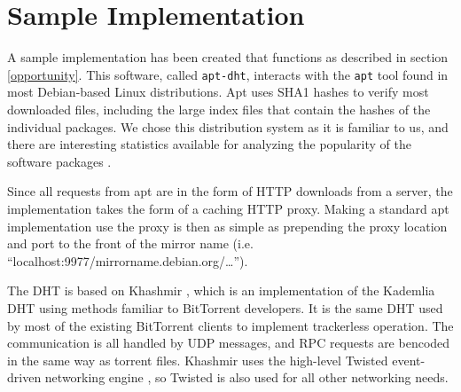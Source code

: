 \documentclass[conference]{IEEEtran}
\begin{document}
% 


\section{Sample Implementation}
\label{implementation}

A sample implementation has been created that functions as described
in section \ref{opportunity}. This software, called
\texttt{apt-dht}, interacts with the \texttt{apt} tool found in most
Debian-based Linux distributions. Apt uses SHA1 hashes to
verify most downloaded files, including the large index files that
contain the hashes of the individual packages. We chose this
distribution system as it is familiar to us, and there are
interesting statistics available for analyzing the popularity of the
software packages \cite{popcon}.

Since all requests from apt are in the form of HTTP downloads from a
server, the implementation takes the form of a caching HTTP proxy.
Making a standard apt implementation use the proxy is then as simple
as prepending the proxy location and port to the front of the mirror
name (i.e. ``localhost:9977/mirrorname.debian.org/\ldots'').

The DHT is based on Khashmir \cite{khashmir}, which is an implementation of the
Kademlia DHT \cite{kademlia} using methods familiar to BitTorrent
developers. It is the same DHT used by most of the existing
BitTorrent clients to implement trackerless operation. The
communication is all handled by UDP messages, and RPC requests are
bencoded in the same way as torrent files. Khashmir uses the high-level
Twisted event-driven networking engine \cite{twisted}, so Twisted is also used for
all other networking needs.
\end{document}
